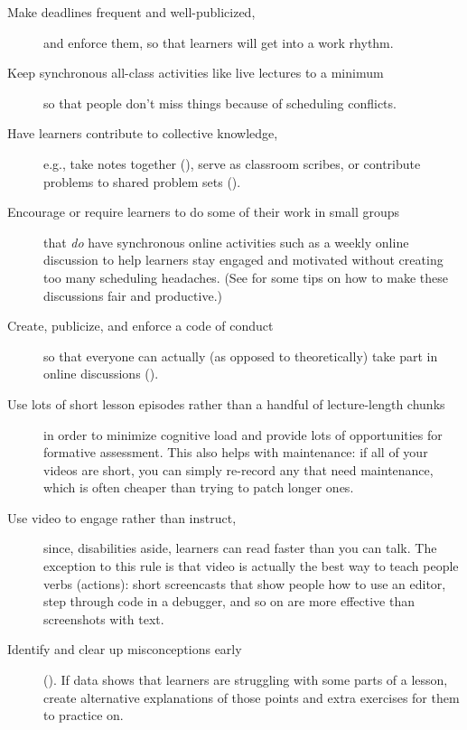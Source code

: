 \begin{description}
\item[Make deadlines frequent and well-publicized,]
and enforce them, so that learners will get into a work rhythm.
\item[Keep synchronous all-class activities like live lectures to a minimum]
so that people don't miss things because of scheduling conflicts.
\item[Have learners contribute to collective knowledge,]
e.g., take notes together (),
serve as classroom scribes, or contribute problems to shared problem
sets ().
\item[Encourage or require learners to do some of their work in small groups]
that \emph{do} have synchronous online activities such as a weekly online
discussion to help learners stay engaged and motivated without
creating too many scheduling headaches. (See
 for some tips on how to make these
discussions fair and productive.)
\item[Create, publicize, and enforce a code of conduct]
so that everyone can actually (as opposed to theoretically) take
part in online discussions ().
\item[Use lots of short lesson episodes rather than a handful of lecture-length chunks]
in order to minimize cognitive load and provide lots of
opportunities for formative assessment. This also helps with
maintenance: if all of your videos are short, you can simply
re-record any that need maintenance, which is often cheaper than
trying to patch longer ones.
\item[Use video to engage rather than instruct,]
since, disabilities aside, learners can read faster than you can
talk. The exception to this rule is that video is actually the best
way to teach people verbs (actions): short screencasts that show
people how to use an editor, step through code in a debugger, and so
on are more effective than screenshots with text.
\item[Identify and clear up misconceptions early]
(). If data shows that learners are struggling
with some parts of a lesson, create alternative explanations of
those points and extra exercises for them to practice on.
\end{description}

